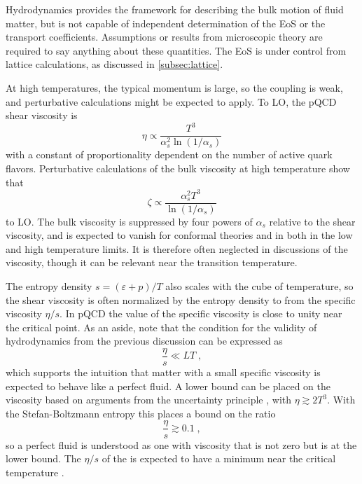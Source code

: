 Hydrodynamics provides the framework for describing the bulk motion of fluid matter, but is not capable of independent determination of the \ac{EoS} or the transport coefficients.
Assumptions or results from microscopic theory are required to say anything about these quantities.
The \qcd \ac{EoS} is under control from lattice calculations, as discussed in \cref{subsec:lattice}. %

At high temperatures, the typical momentum is large, so the coupling is weak, and perturbative calculations might be expected to apply.
To \ac{LO}, the \ac{pQCD} shear viscosity is \cite{Arnold:2000dr}
\begin{equation}
\eta \propto \frac{T^3}{\alpha_s^2 \ln \left( 1/\alpha_s\right) }
\end{equation}
with a constant of proportionality dependent on the number of active quark flavors.
Perturbative calculations of the bulk viscosity at high temperature show that \cite{Arnold:2006fz}
\begin{equation}
\zeta \propto \frac{\alpha_s^2 T^3}{\ln \left(1/\alpha_s\right)}
\end{equation}
to \ac{LO}.
The bulk viscosity is suppressed by four powers of $\alpha_s$ relative to the shear viscosity, and is expected to vanish for conformal theories and in both in the low and high temperature limits.
It is therefore often neglected in discussions of the \qgp viscosity, though it can be relevant near the transition temperature.

The entropy density $s = (\varepsilon + p)/T$ also scales with the cube of temperature, so the shear viscosity is often normalized by the entropy density to from the specific viscosity $\eta/s$.
In \ac{pQCD} the value of the specific viscosity is close to unity near the critical point.
As an aside, note that the condition for the validity of hydrodynamics from the previous discussion can be expressed as
\begin{equation}
  \frac{\eta}{s} \ll LT \;,
\end{equation}
which supports the intuition that matter with a small specific viscosity is expected to behave like a perfect fluid.
A lower bound can be placed on the viscosity based on arguments from the uncertainty principle \cite{Danielewicz:1984ww}, with $\eta \gtrsim 2T^3$.
With the Stefan-Boltzmann entropy this places a bound on the ratio
\begin{equation}
  \label{eq:eta_over_s_uncertainty}
  \frac{\eta}{s} \gtrsim 0.1 \; ,
\end{equation}
so a perfect fluid is understood as one with viscosity that is not zero but is at the lower bound.
The $\eta/s$ of the \qgp is expected to have a minimum near the critical temperature \cite{Csernai:2006zz}.

